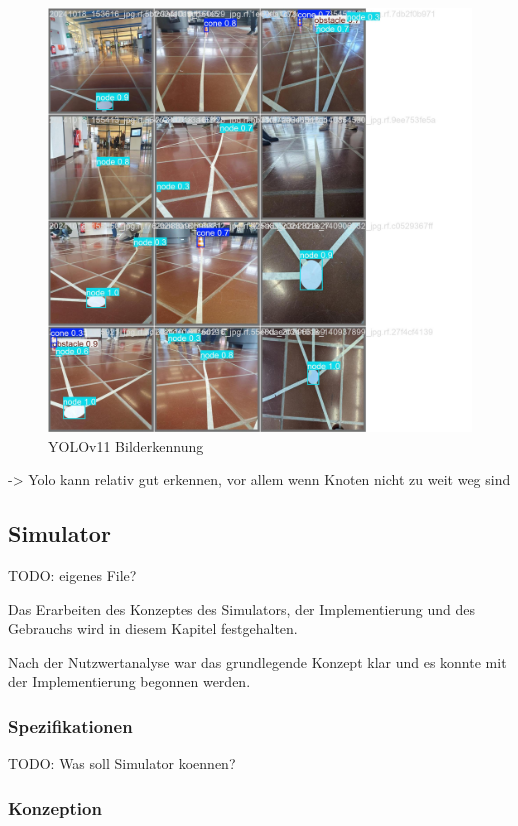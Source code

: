\begin{figure}[H]
\centering
\includegraphics[width=\textwidth -30mm]{assets/informatik-prototyp/yolo/recognized-images.jpeg}
\caption{YOLOv11 Bilderkennung}
\label{fig:img-recognition-yolo}
\end{figure}

-> Yolo kann relativ gut erkennen, vor allem wenn Knoten nicht zu weit weg sind

\subsection{Simulator}

TODO: eigenes File?

Das Erarbeiten des Konzeptes des Simulators, der Implementierung und des Gebrauchs wird in diesem Kapitel festgehalten.

Nach der Nutzwertanalyse war das grundlegende Konzept klar und es konnte mit der Implementierung begonnen werden.

\subsubsection{Spezifikationen}

TODO: Was soll Simulator koennen?

\subsubsection{Konzeption}


